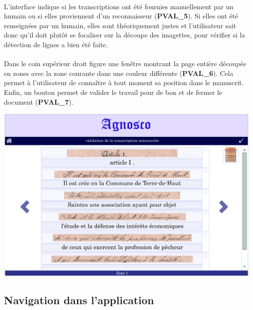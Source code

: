 \paragraph{}
L’interface indique si les transcriptions ont été fournies manuellement par un
humain ou si elles proviennent d’un reconnaisseur (\textbf{PVAL\_5}). Si elles
ont été renseignées par un humain, elles sont théoriquement justes et
l’utilisateur sait donc qu’il doit plutôt se focaliser sur la découpe des
imagettes, pour vérifier si la détection de lignes a bien été faite.

\paragraph{}
Dans le coin supérieur droit figure une fenêtre montrant la page entière
découpée en zones avec la zone courante dans une couleur différente
(\textbf{PVAL\_6}). Cela permet à l’utilisateur de connaître à tout moment sa
position dans le manuscrit. Enfin, un bouton permet de valider le travail pour
de bon et de fermer le document (\textbf{PVAL\_7}).

\newpage

\begin{mdframed}[frametitle={Figure 10 : Validation}, innerbottommargin=10]
\begin{center}
\includegraphics[scale=0.05]{ihm5.jpg}
\end{center}
\end{mdframed}

\subsection{Navigation dans l'application}

